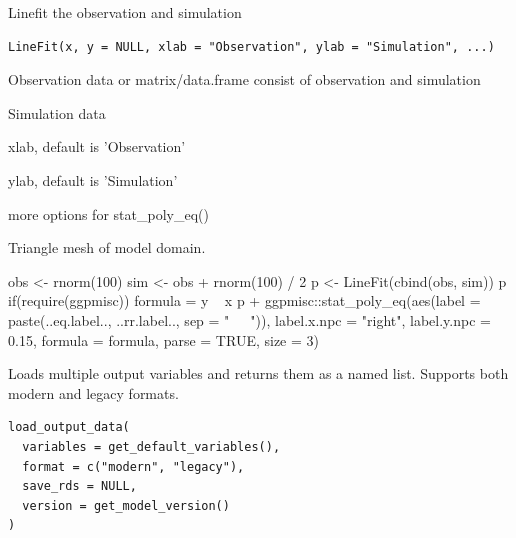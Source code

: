 \documentclass[a4paper]{book}
\begin{document}
%
\begin{Description}\relax
Linefit the observation and simulation
\end{Description}
%
\begin{Usage}
\begin{verbatim}
LineFit(x, y = NULL, xlab = "Observation", ylab = "Simulation", ...)
\end{verbatim}
\end{Usage}
%
\begin{Arguments}
\begin{ldescription}
\item[\code{x}] Observation data or matrix/data.frame consist of observation and simulation

\item[\code{y}] Simulation data

\item[\code{xlab}] xlab, default is 'Observation'

\item[\code{ylab}] ylab, default is 'Simulation'

\item[\code{...}] more options for stat\_poly\_eq()
\end{ldescription}
\end{Arguments}
%
\begin{Value}
Triangle mesh of model domain.
\end{Value}
%
\begin{Examples}
\begin{ExampleCode}
obs <- rnorm(100)
sim <- obs + rnorm(100) / 2
p <- LineFit(cbind(obs, sim))
p
if(require(ggpmisc)){
formula = y ~ x
p + ggpmisc::stat_poly_eq(aes(label = paste(..eq.label.., ..rr.label.., sep = "~~~")), 
label.x.npc = "right", label.y.npc = 0.15,
formula = formula, parse = TRUE, size = 3)
}
\end{ExampleCode}
\end{Examples}
%
\begin{Description}\relax
Loads multiple output variables and returns them as a named list.
Supports both modern and legacy formats.
\end{Description}
%
\begin{Usage}
\begin{verbatim}
load_output_data(
  variables = get_default_variables(),
  format = c("modern", "legacy"),
  save_rds = NULL,
  version = get_model_version()
)
\end{verbatim}
\end{Usage}
\end{document}

